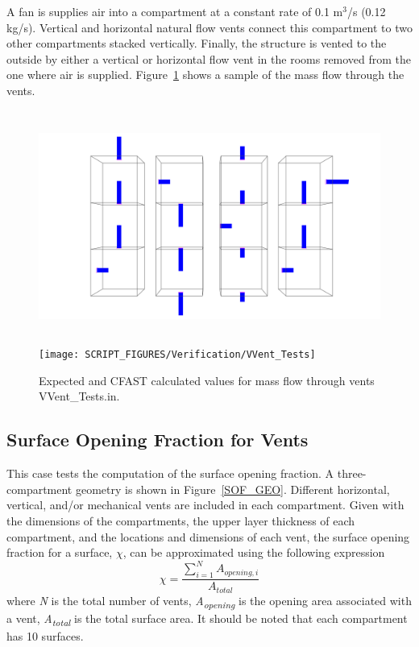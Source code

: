A fan is supplies air into a compartment at a constant rate of 0.1 m$^3$/s (0.12 kg/s). Vertical and horizontal natural flow vents connect this compartment to two other compartments stacked vertically.  Finally, the structure is vented to the outside by either a vertical or horizontal flow vent in the rooms removed from the one where air is supplied. Figure~\ref{fig:vvent} shows a sample of the mass flow through the vents.

\begin{figure}
\begin{center}
\includegraphics[height=3.0in]{FIGURES/Verification/VVent_Geom} \\
\texttt{[image: SCRIPT\_FIGURES/Verification/VVent\_Tests]}
\end{center}
\caption[Results of the test case {\ct VVent\_Tests.in}]{Expected and CFAST calculated values for mass flow through vents {\ct VVent\_Tests.in}.}
\label{fig:vvent}
\end{figure}


\subsection{Surface Opening Fraction for Vents}
\label{Surface_Opening_Fraction}

This case tests the computation of the surface opening fraction. A three-compartment geometry is shown in Figure~\ref{SOF_GEO}. Different horizontal, vertical, and/or mechanical vents are included in each compartment. Given with the dimensions of the compartments, the upper layer thickness of each compartment, and the locations and dimensions of each vent, the surface opening fraction for a surface, $\chi$, can be approximated using the following expression
\begin{equation}
\chi = \frac{\sum_{i=1}^N A_{opening,i}} {A_{total}}
\end{equation}
where \textit{N} is the total number of vents, \textit{A\textsubscript{opening}} is the opening area associated with a vent, \textit{A\textsubscript{total}} is the total surface area. It should be noted that each compartment has 10 surfaces.

